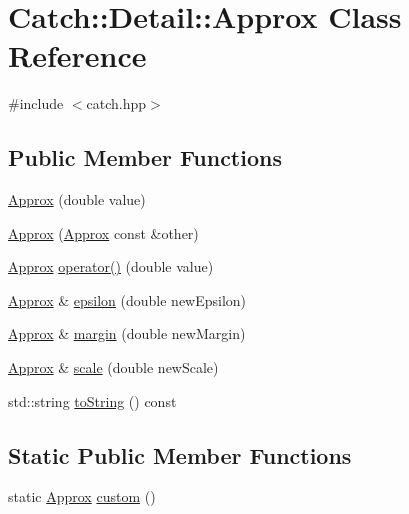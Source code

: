 \hypertarget{classCatch_1_1Detail_1_1Approx}{\section{Catch\-:\-:Detail\-:\-:Approx Class Reference}
\label{classCatch_1_1Detail_1_1Approx}
}


{\ttfamily \#include $<$catch.\-hpp$>$}

\subsection*{Public Member Functions}
\begin{DoxyCompactItemize}
\item 
\hyperlink{classCatch_1_1Detail_1_1Approx_a1a8618ea8db08c66bd3d9fe8f74b957a}{Approx} (double value)
\item 
\hyperlink{classCatch_1_1Detail_1_1Approx_a807330c63266fc914abdf6e461255a54}{Approx} (\hyperlink{classCatch_1_1Detail_1_1Approx}{Approx} const \&other)
\item 
\hyperlink{classCatch_1_1Detail_1_1Approx}{Approx} \hyperlink{classCatch_1_1Detail_1_1Approx_a48c9cbc28a05dc9dc8c3973b9eae2268}{operator()} (double value)
\item 
\hyperlink{classCatch_1_1Detail_1_1Approx}{Approx} \& \hyperlink{classCatch_1_1Detail_1_1Approx_a05c50c3ad0a971fab19345b5d94979a9}{epsilon} (double new\-Epsilon)
\item 
\hyperlink{classCatch_1_1Detail_1_1Approx}{Approx} \& \hyperlink{classCatch_1_1Detail_1_1Approx_a82f7049b41c16e6234275641fad22218}{margin} (double new\-Margin)
\item 
\hyperlink{classCatch_1_1Detail_1_1Approx}{Approx} \& \hyperlink{classCatch_1_1Detail_1_1Approx_acd80f0737bf38112beacd5ca95bef113}{scale} (double new\-Scale)
\item 
std\-::string \hyperlink{classCatch_1_1Detail_1_1Approx_adeb74b73506b3f6b2ba72aea15168fbe}{to\-String} () const 
\end{DoxyCompactItemize}
\subsection*{Static Public Member Functions}
\begin{DoxyCompactItemize}
\item 
static \hyperlink{classCatch_1_1Detail_1_1Approx}{Approx} \hyperlink{classCatch_1_1Detail_1_1Approx_aaf86dc0ee92272ac2d9839197a07951d}{custom} ()
\end{DoxyCompactItemize}
